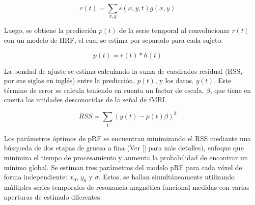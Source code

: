 \begin{equation}
	r(t)=\sum_{x,y}s(x,y,t)g(x,y)
\end{equation}

Luego, se obtiene la predicción $p(t)$ de la serie temporal al convolucionar $r(t)$ con un modelo de HRF, el cual se estima por separado para cada sujeto.

\begin{equation}
	p(t) = r(t) * h(t)
\end{equation}

La bondad de ajuste se estima calculando la suma de cuadrados residual (RSS, por sus siglas en ingl\'es) entre la predicción, $p(t)$, y los datos, $y(t)$. Este término de error se calcula teniendo en cuenta un factor de escala, $\beta$, que tiene en cuenta las unidades desconocidas de la señal de fMRI.

\begin{equation}
	RSS = \sum_{t}(y(t)-p(t)\beta)^2
\end{equation}

Los parámetros óptimos de pRF se encuentran minimizando el RSS mediante una búsqueda de dos etapas de gruesa a fina (Ver [\cite{dumoulin_population_2008}] para m\'as detalles), enfoque que minimiza el tiempo de procesamiento y aumenta la probabilidad de encontrar un mínimo global. Se estiman tres parámetros del modelo pRF para cada vóxel de forma independiente: $x_0$, $y_0$ y $\sigma$. Estos, se hallan simultáneamente utilizando múltiples series temporales de resonancia magnética funcional medidas con varias aperturas de estímulo diferentes.

